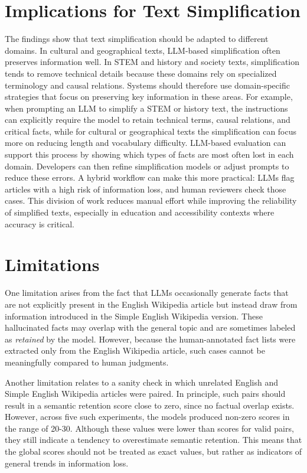 \documentclass{DESSThesis}
\begin{document}
\section{Implications for Text Simplification}
The findings show that text simplification should be adapted to different domains. In cultural and geographical texts, LLM-based simplification often preserves information well. In STEM and history and society texts, simplification tends to remove technical details because these domains rely on specialized terminology and causal relations. Systems should therefore use domain-specific strategies that focus on preserving key information in these areas. For example, when prompting an LLM to simplify a STEM or history text, the instructions can explicitly require the model to retain technical terms, causal relations, and critical facts, while for cultural or geographical texts the simplification can focus more on reducing length and vocabulary difficulty.
LLM-based evaluation can support this process by showing which types of facts are most often lost in each domain. Developers can then refine simplification models or adjust prompts to reduce these errors. A hybrid workflow can make this more practical: LLMs flag articles with a high risk of information loss, and human reviewers check those cases. This division of work reduces manual effort while improving the reliability of simplified texts, especially in education and accessibility contexts where accuracy is critical.
\section{Limitations}

One limitation arises from the fact that LLMs occasionally generate facts that are not explicitly present in the English Wikipedia article but instead draw from information introduced in the Simple English Wikipedia version. These hallucinated facts may overlap with the general topic and are sometimes labeled as \textit{retained} by the model. However, because the human-annotated fact lists were extracted only from the English Wikipedia article, such cases cannot be meaningfully compared to human judgments. 

Another limitation relates to a sanity check in which unrelated English and Simple English Wikipedia articles were paired. In principle, such pairs should result in a semantic retention score close to zero, since no factual overlap exists. However, across five such experiments, the models produced non-zero scores in the range of 20-30. Although these values were lower than scores for valid pairs, they still indicate a tendency to overestimate semantic retention. This means that the global scores should not be treated as exact values, but rather as indicators of general trends in information loss.
\end{document}
